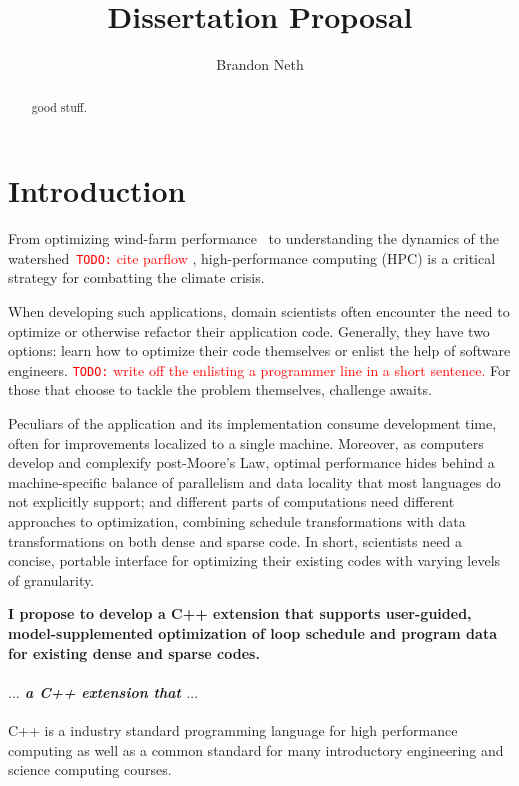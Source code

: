 \documentclass{article}
\author{Brandon Neth}
\title{Dissertation Proposal}
\newcommand{\todo}[1]{{\textcolor{red}{{\tt{TODO:}}\,\,#1 }}}
\begin{document}
\maketitle

\begin{abstract}
    good stuff.
\end{abstract}



\section{Introduction}
From optimizing wind-farm performance~\cite{sprague2020exawind} to understanding the dynamics of the watershed~\cite{olschanowsky2019hydroframe}\todo{cite parflow},
high-performance computing (HPC) is a critical strategy for combatting the climate crisis. 




When developing such applications, domain scientists often encounter the need to optimize or otherwise refactor their application code. 
Generally, they have two options: learn how to optimize their code themselves or enlist the help of software engineers. 
\todo{write off the enlisting a programmer line in a short sentence.} 
For those that choose to tackle the problem themselves, challenge awaits. 

Peculiars of the application and its implementation consume development time, often for improvements localized to a single machine. 
Moreover, as computers develop and complexify post-Moore's Law, optimal performance hides behind a machine-specific balance of parallelism and data locality that most languages do not explicitly support; and 
different parts of computations need different approaches to optimization, combining schedule transformations with data transformations on both dense and sparse code.
In short, scientists need a concise, portable interface for optimizing their existing codes with varying levels of granularity.


\textbf{I propose to develop a C++ extension that supports user-guided, model-supplemented optimization of loop schedule and program data for existing dense and sparse codes.}
\paragraph{$\dots$ \textit{a C++ extension that} $\dots$}
C++ is a industry standard programming language for high performance computing as well as a common standard for many introductory engineering and science computing courses.
\end{document}
